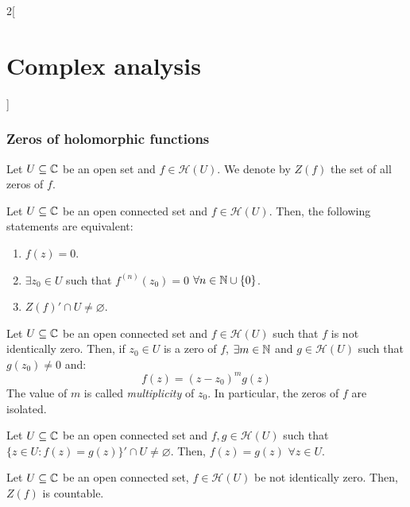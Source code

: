 \documentclass[../../../main.tex]{subfiles}
\begin{document}
\begin{multicols}{2}[\section{Complex analysis}]
  \subsubsection{Zeros of holomorphic functions}
  \begin{definition}
    Let $U\subseteq\mathbb{C}$ be an open set and $f\in\mathcal{H}(U)$. We denote by $Z(f)$ the set of all zeros of $f$.
  \end{definition}
  \begin{theorem}
    Let $U\subseteq\mathbb{C}$ be an open connected set and $f\in\mathcal{H}(U)$. Then, the following statements are equivalent:
    \begin{enumerate}
      \item $f(z)=0$.
      \item $\exists z_0\in U$ such that $f^{(n)}(z_0)=0$ $\forall n\in\mathbb{N}\cup\{0\}$.
      \item ${Z(f)}'\cap U\ne\varnothing$.
    \end{enumerate}
  \end{theorem}
  \begin{corollary}
    Let $U\subseteq\mathbb{C}$ be an open connected set and $f\in\mathcal{H}(U)$ such that $f$ is not identically zero. Then, if $z_0\in U$ is a zero of $f$, $\exists m\in\mathbb{N}$ and $g\in\mathcal{H}(U)$ such that $g(z_0)\ne 0$ and: $$f(z)={(z-z_0)}^{m}g(z)$$ The value of $m$ is called \emph{multiplicity} of $z_0$. In particular, the zeros of $f$ are isolated.
  \end{corollary}
  \begin{theorem}
    Let $U\subseteq\mathbb{C}$ be an open connected set and $f,g\in\mathcal{H}(U)$ such that ${\{z\in U:f(z)=g(z)\}}'\cap U\ne\varnothing$. Then, $f(z)=g(z)$ $\forall z\in U$.
  \end{theorem}
  \begin{corollary}
    Let $U\subseteq\mathbb{C}$ be an open connected set, $f\in\mathcal{H}(U)$ be not identically zero. Then, $Z(f)$ is countable.
  \end{corollary}

\end{multicols}
\end{document}
